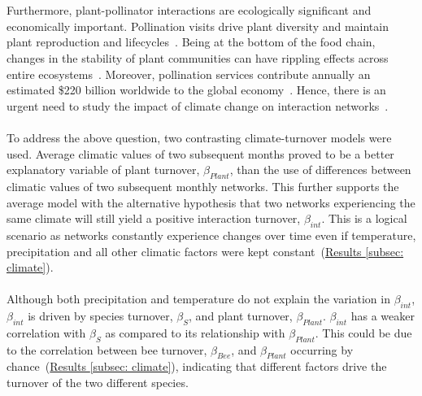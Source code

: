 \documentclass[11pt]{article}
\begin{document}
\\
\\
Furthermore, plant-pollinator interactions are ecologically significant and economically important. Pollination visits drive plant diversity and maintain plant reproduction and lifecycles~\citep{Olesen2008}. Being at the bottom of the food chain, changes in the stability of plant communities can have rippling effects across entire ecosystems~\citep{Scaven2013}. Moreover, pollination services contribute annually an estimated \$220 billion worldwide to the global economy~\citep{Gallai2009}. Hence, there is an urgent need to study the impact of climate change on interaction networks~\citep{Scaven2013}.\\
\\
To address the above question, two contrasting climate-turnover models were used. Average climatic values of two subsequent months proved to be a better explanatory variable of plant turnover, $\beta_{Plant}$, than the use of differences between climatic values of two subsequent monthly networks. This further supports the average model with the alternative hypothesis that two networks experiencing the same climate will still yield a positive interaction turnover, $\beta_{int}$. This is a logical scenario as networks constantly experience changes over time even if temperature, precipitation and all other climatic factors were kept constant~(\hyperref[subsec: climate]{Results \ref{subsec: climate}}).\\
\\
Although both precipitation and temperature do not explain the variation in $\beta_{int}$, $\beta_{int}$ is driven by species turnover, $\beta_{S}$, and plant turnover, $\beta_{Plant}$. $\beta_{int}$ has a weaker correlation with $\beta_{S}$ as compared to its relationship with $\beta_{Plant}$. This could be due to the correlation between bee turnover, $\beta_{Bee}$, and $\beta_{Plant}$ occurring by chance~(\hyperref[subsec: climate]{Results \ref{subsec: climate}}), indicating that different factors drive the turnover of the two different species. \\
\\
\end{document}
